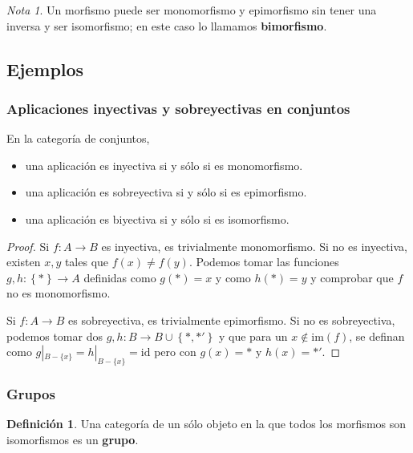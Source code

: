 \documentclass[11pt]{article}
\theoremstyle{plain}
\theoremstyle{definition}
\newtheorem{definition}{Definición}
\theoremstyle{remark}
\newtheorem*{remark}{Nota}
\begin{document}
\begin{remark}
Un morfismo puede ser monomorfismo y epimorfismo sin tener una inversa
y ser isomorfismo; en este caso lo llamamos \textbf{bimorfismo}.
\end{remark}

\subsection{Ejemplos}
\label{sec:orga8f9ae5}
\subsubsection{Aplicaciones inyectivas y sobreyectivas en conjuntos}
\label{sec:org09c6100}
\begin{proposition}
En la categoría de conjuntos,

\begin{itemize}
\item una aplicación es inyectiva si y sólo si es monomorfismo.
\item una aplicación es sobreyectiva si y sólo si es epimorfismo.
\item una aplicación es biyectiva si y sólo si es isomorfismo.
\end{itemize}
\end{proposition}

\begin{proof}
Si \(f \colon A \to B\) es inyectiva, es trivialmente monomorfismo. Si
no es inyectiva, existen \(x,y\) tales que \(f(x) \neq f(y)\). Podemos
tomar las funciones \(g,h \colon \left\{ \ast \right\} \to A\) definidas como \(g(\ast) = x\) y
como \(h(\ast) = y\) y comprobar que \(f\) no es monomorfismo.

Si \(f \colon A \to B\) es sobreyectiva, es trivialmente epimorfismo. Si
no es sobreyectiva, podemos tomar dos \(g,h \colon B \to B \cup \left\{ \ast,\ast' \right\}\) y que 
para un \(x \notin \mathrm{im}(f)\), se definan como \(g|_{B-\{x\}} = h|_{B-\{x\}} = \mathrm{id}\) pero con
\(g(x) = \ast\) y \(h(x) = \ast'\).
\end{proof}

\subsubsection{Grupos}
\label{sec:org3ad2a9b}
\begin{definition}
Una categoría de un sólo objeto en la que todos los morfismos son
isomorfismos es un \textbf{grupo}.
\end{definition}
\end{document}
